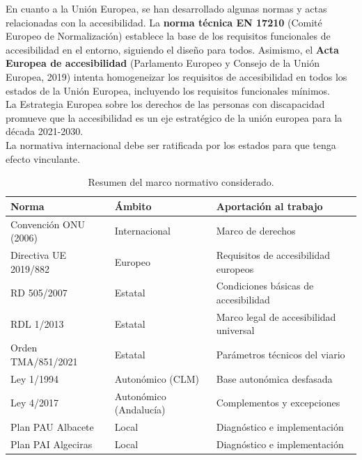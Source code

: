 En cuanto a la Unión Europea, se han desarrollado algunas normas y actas relacionadas con la accesibilidad. La \textbf{norma técnica EN 17210} (Comité Europeo de Normalización) establece la base de los requisitos funcionales de accesibilidad en el entorno, siguiendo el diseño para todos. Asimismo, el \textbf{Acta Europea de accesibilidad} (Parlamento Europeo y Consejo de la Unión Europea, 2019) intenta homogeneizar los requisitos de accesibilidad en todos los estados de la Unión Europea, incluyendo los requisitos funcionales mínimos.
\\

La Estrategia Europea sobre los derechos de las personas con discapacidad promueve que la accesibilidad es un eje estratégico de la unión europea para la década 2021-2030.
\\

La normativa internacional debe ser ratificada por los estados para que tenga efecto vinculante.
\\

\begin{table}[htbp]
  \centering
  \caption{Resumen del marco normativo considerado.}
  \label{tab:marco-normativo}
  \begin{tabular}{>{\raggedright\arraybackslash}p{4cm}>{\raggedright\arraybackslash}p{4.5cm}>{\raggedright\arraybackslash}p{6cm}}
    \toprule
    \textbf{Norma} & \textbf{Ámbito} & \textbf{Aportación al trabajo} \\
    \midrule
    Convención ONU (2006) & Internacional & Marco de derechos \\
    Directiva UE 2019/882 & Europeo & Requisitos de accesibilidad europeos \\
    RD 505/2007 & Estatal & Condiciones básicas de accesibilidad \\
    RDL 1/2013 & Estatal & Marco legal de accesibilidad universal \\
    Orden TMA/851/2021 & Estatal & Parámetros técnicos del viario \\
    Ley 1/1994 & Autonómico (CLM) & Base autonómica desfasada \\
    Ley 4/2017 & Autonómico (Andalucía) & Complementos y excepciones \\
    Plan PAU Albacete & Local & Diagnóstico e implementación \\
    Plan PAI Algeciras & Local & Diagnóstico e implementación \\
    \bottomrule
  \end{tabular}
\end{table}

